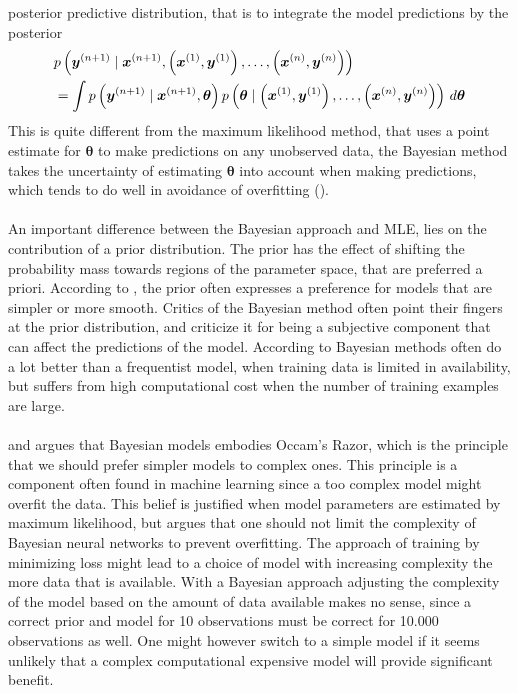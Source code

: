 posterior predictive distribution, that is to integrate the model predictions by the posterior
\begin{equation} \label{eq:post_pred_distribution}
    \begin{split}
        &p\left(\boldsymbol{y}^{(n+1)} \mid \boldsymbol{x}^{(n+1)}, \left (\boldsymbol{x}^{(1)},\boldsymbol{y}^{(1)}\right), \ldots, \left (\boldsymbol{x}^{(n)}, \boldsymbol{y}^{(n)}\right)\right)\\
        &=\int p\left(\boldsymbol{y}^{(n+1)} \mid \boldsymbol{x}^{(n+1)}, \boldsymbol{\theta} \right) p \left (\boldsymbol{\theta} \mid \left (\boldsymbol{x}^{(1)}, \boldsymbol{y}^{(1)}\right), \ldots, \left (\boldsymbol{x}^{(n)}, \boldsymbol{y}^{(n)}\right)\right) \, d \boldsymbol{\theta}
    \end{split}
\end{equation}
This is quite different from the maximum likelihood method, that uses a point estimate for $\boldsymbol{\theta}$ to make predictions on any unobserved data, the Bayesian method takes the uncertainty of estimating $\boldsymbol{\theta}$ into account when making predictions, which tends to do well in avoidance of overfitting (\cite{Goodfellow-et-al-2016}).  
\\
\\
An important difference between the Bayesian approach and MLE, lies on the contribution of a prior distribution. The prior has the effect of shifting the probability mass towards regions of the parameter space, that are preferred a priori. According to \cite{Goodfellow-et-al-2016}, the prior often expresses a preference for models that are simpler or more smooth. Critics of the Bayesian method often point their fingers at the prior distribution, and criticize it for being a subjective component that can affect the predictions of the model. According to \cite{neal2012bayesian} Bayesian methods often do a lot better than a frequentist model, when training data is limited in availability, but suffers from high computational cost when the number of training examples are large. 
\\
\\
\cite{neal2012bayesian} and \cite{mackay1991} argues that Bayesian models embodies Occam's Razor, which is the principle that we should prefer simpler models to complex ones. This principle is a component often found in machine learning since a too complex model might overfit the data. This belief is justified when model parameters are estimated by maximum likelihood, but \cite{neal2012bayesian} argues that one should not limit the complexity of Bayesian neural networks to prevent overfitting. The approach of training by minimizing loss might lead to a choice of model with increasing complexity the more data that is available. With a Bayesian approach adjusting the complexity of the model based on the amount of data available makes no sense, since a correct prior and model for 10 observations must be correct for 10.000 observations as well. One might however switch to a simple model if it seems unlikely that a complex computational expensive model will provide significant benefit. 
